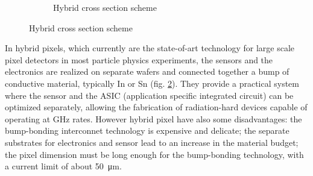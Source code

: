 \begin{figure}
\begin{subfigure}[b]{0.49\textwidth}
         \caption{Hybrid cross section scheme}
         \label{fig:hybrid_scheme}
      \end{subfigure}
   \end{figure}
   In hybrid pixels, which currently are the state-of-art technology for large scale pixel detectors in most particle physics experiments, the sensors and the electronics are realized on separate wafers and connected together a bump of conductive material, typically In or Sn  (fig. \ref{fig:hybrid_scheme}). 
   They provide a practical system where the sensor and the ASIC (application specific integrated circuit) can be optimized separately, allowing the fabrication of radiation-hard devices capable of operating at \si{GHz} rates.
   However hybrid pixel have also some disadvantages: the bump-bonding interconnet technology is expensive and delicate; the separate substrates for electronics and sensor lead to an increase in the material budget; the pixel dimension must be long enough for the bump-bonding technology, with a current limit of about \SI{50}{\um}.

